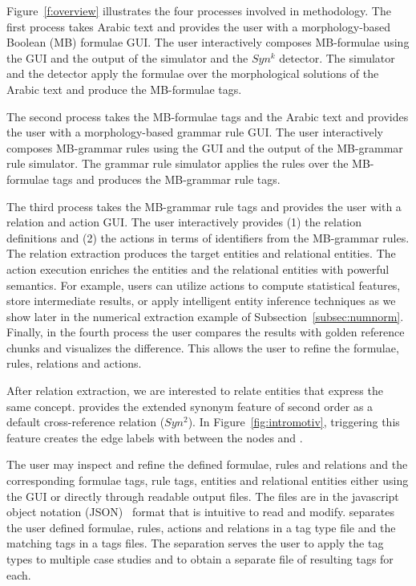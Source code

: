 


Figure~\ref{f:overview} illustrates the four processes involved in 
\framework methodology. 
The first process takes Arabic text and provides the user 
with a morphology-based Boolean (MB) formulae GUI. 
The user interactively composes MB-formulae using the GUI and the output 
of the simulator and the $Syn^k$ detector. 
The simulator and the detector apply the formulae over the morphological solutions 
of the Arabic text and produce the MB-formulae tags. 

The second process takes the MB-formulae tags and the Arabic text and provides
the user with a morphology-based grammar rule GUI. 
The user interactively composes MB-grammar rules using the GUI and the output 
of the MB-grammar rule simulator. 
The grammar rule simulator applies the rules over the MB-formulae tags and 
produces the MB-grammar rule tags. 

The third process takes the MB-grammar rule tags and provides the user with 
a relation and action GUI. 
The user interactively provides (1) the relation definitions and 
(2) the actions in terms of identifiers from the MB-grammar 
rules.
The relation extraction produces the target entities and relational
entities. 
The action execution enriches the entities and the relational entities
with powerful semantics.
For example, users can utilize actions to compute statistical features, 
store intermediate results, 
or apply intelligent entity inference techniques
as we show later in the numerical extraction example of 
Subsection~\ref{subsec:numnorm}.
%
Finally, in the fourth process the user compares the results with golden
reference chunks and visualizes the difference. 
This allows the user to refine the formulae, rules, relations and actions. 

After relation extraction, we are interested to relate 
entities that express the same concept.
\framework provides the extended synonym feature of second order as 
a default cross-reference relation ($Syn^2$).
In Figure~\ref{fig:intromotiv}, triggering this feature creates the 
edge labels with  
between the nodes  and .



The user may inspect and refine the defined formulae, rules and relations and 
the corresponding formulae tags, rule tags, entities and relational entities
either using the GUI or directly through readable output files. 
The files are in the javascript object notation (JSON)~\cite{nolan2014javascript} 
format that is intuitive to read and modify. 
\framework separates the user defined formulae, rules, actions and relations in
a \framework tag type file and the 
matching tags in a tags files. 
The separation serves the user to apply the tag types to multiple case studies 
and to obtain a separate file of resulting tags for each. 


